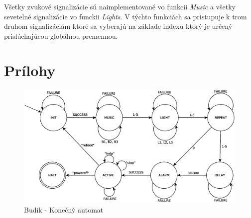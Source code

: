 \documentclass[11pt,a4paper]{article}
\begin{document}
        \indent Všetky zvukové signalizácie sú naimplementované vo funkcii \textit{Music} a všetky sevetelné signalizácie vo funckii \textit{Lights}. V týchto funkciách sa pristupuje k trom druhom signalizáciám ktoré sa vyberajú na základe indexu ktorý je určený prislúchajúcou globálnou premennou.

  
\newpage
\section{Prílohy}

\begin{figure}[H]
    \centering
    \includegraphics[scale=0.55]{img/fsm.eps}
    \caption{Budík - Konečný automat}
    \label{fig:fsm}
\end{figure}

\newpage %

\makeatletter
\makeatother

\begin{flushleft}
    
\end{flushleft}
\end{document}
